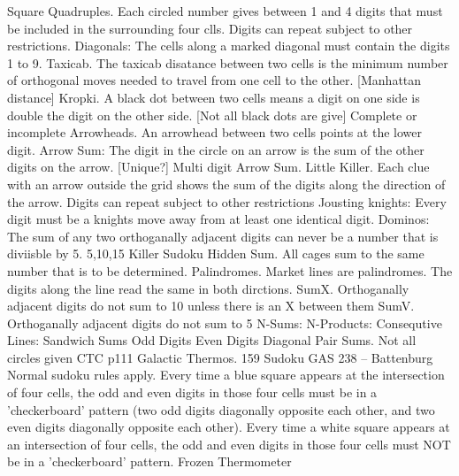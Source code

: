 \documentclass{article}
\begin{document}
Square Quadruples. Each circled number gives between 1 and 4 digits that must be included in the surrounding four clls. Digits can repeat subject to other restrictions. 
Diagonals: The cells along a marked diagonal must contain the digits 1 to 9. 
Taxicab. The taxicab disatance between two cells is the minimum number of orthogonal moves needed to travel from one cell to the other. [Manhattan distance]
Kropki. A black dot between two cells means a digit on one side is double the digit on the other side. [Not all black dots are give] Complete or incomplete
Arrowheads. An arrowhead between two cells points at the lower digit.
Arrow Sum: The digit in the circle on an arrow is the sum of the other digits on the arrow.  [Unique?]
Multi digit Arrow Sum. 
Little Killer. Each clue with an arrow outside the grid shows the sum of the digits along the direction of the arrow. Digits can repeat subject to other restrictions
Jousting knights: Every digit must be a knights move away from at least one identical digit. 
Dominos: The sum of any two orthoganally adjacent digits can never be a number that is diviisble by 5. {5,10,15}
Killer Sudoku Hidden Sum. All cages sum to the same number that is to be determined. 
Palindromes. Market lines are palindromes. The digits along the line read the same in both dirctions. 
SumX. Orthoganally adjacent digits do not sum to 10 unless there is an X between them
SumV. Orthoganally adjacent digits do not sum to 5
N-Sums:
N-Products: 
Consequtive Lines:
Sandwich Sums
Odd Digits
Even Digits
Diagonal Pair Sums. Not all circles given CTC p111
Galactic Thermos. 
159 Sudoku
GAS 238 – Battenburg 
Normal sudoku rules apply. Every time a blue square appears at the intersection of four cells, the odd and even digits in those four cells must be in a 'checkerboard' pattern (two odd digits diagonally opposite each other, and two even digits diagonally opposite each other). Every time a white square appears at an intersection of four cells, the odd and even digits in those four cells must NOT be in a 'checkerboard' pattern. 
Frozen Thermometer
\end{document}
